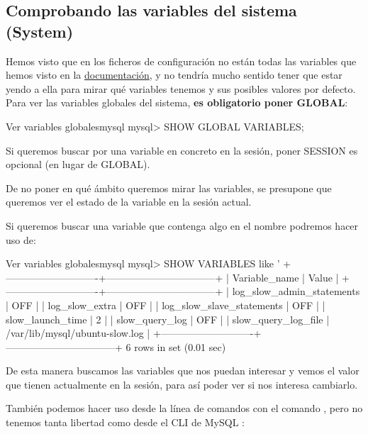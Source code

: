\subsection{Comprobando las variables del sistema (System)}
Hemos visto que en los ficheros de configuración no están todas las variables que hemos visto en la \href{https://dev.mysql.com/doc/refman/8.0/en/server-option-variable-reference.html}{documentación}, y no tendría mucho sentido tener que estar yendo a ella para mirar qué variables tenemos y sus posibles valores por defecto. Para ver las variables globales del sistema, \textbf{es obligatorio poner GLOBAL}:

\begin{mycode}{Ver variables globales}{mysql}{}
mysql> SHOW GLOBAL VARIABLES;
\end{mycode}

Si queremos buscar por una variable en concreto en la sesión, poner SESSION es opcional (en lugar de GLOBAL).

De no poner en qué ámbito queremos mirar las variables, se presupone que queremos ver el estado de la variable en la sesión actual.

Si queremos buscar una variable que contenga algo en el nombre podremos hacer uso de:

\begin{mycode}{Ver variables globales}{mysql}{}
mysql> SHOW VARIABLES like '%
+----------------------------+---------------------------------+
| Variable_name              | Value                           |
+----------------------------+---------------------------------+
| log_slow_admin_statements  | OFF                             |
| log_slow_extra             | OFF                             |
| log_slow_slave_statements  | OFF                             |
| slow_launch_time           | 2                               |
| slow_query_log             | OFF                             |
| slow_query_log_file        | /var/lib/mysql/ubuntu-slow.log  |
+----------------------------+---------------------------------+
6 rows in set (0.01 sec)
\end{mycode}

De esta manera buscamos las variables que nos puedan interesar y vemos el valor que tienen actualmente en la sesión, para así poder ver si nos interesa cambiarlo.

También podemos hacer uso desde la línea de comandos con el comando , pero no tenemos tanta libertad como desde el CLI de MySQL :

